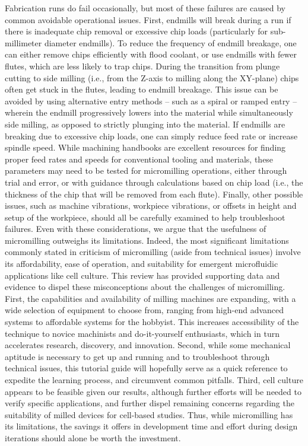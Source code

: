 Fabrication runs do fail occasionally, but most of these failures are caused by common avoidable operational issues. First, endmills will break during a run if there is inadequate chip removal or excessive chip loads (particularly for sub-millimeter diameter endmills). To reduce the frequency of endmill breakage, one can either remove chips efficiently with flood coolant, or use endmills with fewer flutes, which are less likely to trap chips. During the transition from plunge cutting to side milling (i.e., from the Z-axis to milling along the XY-plane) chips often get stuck in the flutes, leading to endmill breakage. This issue can be avoided by using alternative entry methods – such as a spiral or ramped entry – wherein the endmill progressively lowers into the material while simultaneously side milling, as opposed to strictly plunging into the material. If endmills are breaking due to excessive chip loads, one can simply reduce feed rate or increase spindle speed. While machining handbooks are excellent resources for finding proper feed rates and speeds for conventional tooling and materials, these parameters may need to be tested for micromilling operations, either through trial and error, or with guidance through calculations based on chip load (i.e., the thickness of the chip that will be removed from each flute). Finally, other possible issues, such as machine vibrations, workpiece vibrations, or offsets in height and setup of the workpiece, should all be carefully examined to help troubleshoot failures. 	
Even with these considerations, we argue that the usefulness of micromilling outweighs its limitations. Indeed, the most significant limitations commonly stated in criticism of micromilling (aside from technical issues) involve its affordability, ease of operation, and suitability for emergent microfluidic applications like cell culture. This review has provided supporting data and evidence to dispel these misconceptions about the challenges of micromilling. First, the capabilities and availability of milling machines are expanding, with a wide selection of equipment to choose from, ranging from high-end advanced systems to affordable systems for the hobbyist. This increases accessibility of the technique to novice machinists and do-it-yourself enthusiasts, which in turn accelerates research, discovery, and innovation. Second, while some mechanical aptitude is necessary to get up and running and to troubleshoot through technical issues, this tutorial guide will hopefully serve as a quick reference to expedite the learning process, and circumvent common pitfalls. Third, cell culture appears to be feasible given our results, although further efforts will be needed to verify specific applications, and further dispel remaining concerns regarding the suitability of milled devices for cell-based studies. Thus, while micromilling has its limitations, the savings it offers in development time and effort during design iterations should alone be worth the investment.
